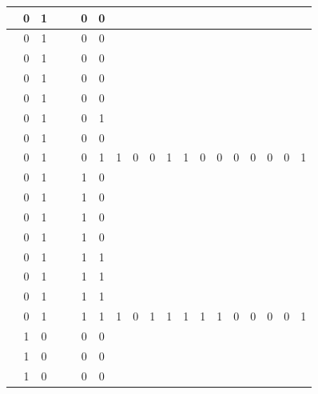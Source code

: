 \begin{table}[!tb]
\begin{tabular}{|c|c|c|c|c|c|c|c|c|c|c|c|c|c|c|c|c|c|c|}
        \rowcolor{red!40}  & 0 & 1 &  &  & 0 & 0 &  &  &  &  &  &  &  &  &  &  &  &  \\ \hline
        \rowcolor{red!40}  & 0 & 1 &  &  & 0 & 0 &  &  &  &  &  &  &  &  &  &  &  &  \\ \hline
        \rowcolor{red!40}  & 0 & 1 &  &  & 0 & 0 &  &  &  &  &  &  &  &  &  &  &  &  \\ \hline
        \rowcolor{red!40}  & 0 & 1 &  &  & 0 & 0 &  &  &  &  &  &  &  &  &  &  &  &  \\ \hline
        \rowcolor{red!40}  & 0 & 1 &  &  & 0 & 0 &  &  &  &  &  &  &  &  &  &  &  &  \\ \hline
        \rowcolor{red!40}  & 0 & 1 &  &  & 0 & 1 &  &  &  &  &  &  &  &  &  &  &  &  \\ \hline
        \rowcolor{red!40}  & 0 & 1 &  &  & 0 & 0 &  &  &  &  &  &  &  &  &  &  &  &  \\ \hline
        \rowcolor{red!40}  & 0 & 1 &  &  & 0 & 1 & 1 & 0 & 0 & 1 & 1 & 0 & 0 & 0 & 0 & 0 & 0 & 1 \\ \hline
        \rowcolor{green!40}  & 0 & 1 &  &  & 1 & 0 &  &  &  &  &  &  &  &  &  &  &  &  \\ \hline
        \rowcolor{green!40}  & 0 & 1 &  &  & 1 & 0 &  &  &  &  &  &  &  &  &  &  &  &  \\ \hline
        \rowcolor{green!40}  & 0 & 1 &  &  & 1 & 0 &  &  &  &  &  &  &  &  &  &  &  &  \\ \hline
        \rowcolor{green!40}  & 0 & 1 &  &  & 1 & 0 &  &  &  &  &  &  &  &  &  &  &  &  \\ \hline
        \rowcolor{green!40}  & 0 & 1 &  &  & 1 & 1 &  &  &  &  &  &  &  &  &  &  &  &  \\ \hline
        \rowcolor{green!40}  & 0 & 1 &  &  & 1 & 1 &  &  &  &  &  &  &  &  &  &  &  &  \\ \hline
        \rowcolor{green!40}  & 0 & 1 &  &  & 1 & 1 &  &  &  &  &  &  &  &  &  &  &  &  \\ \hline
        \rowcolor{green!40}  & 0 & 1 &  &  & 1 & 1 & 1 & 0 & 1 & 1 & 1 & 1 & 1 & 0 & 0 & 0 & 0 & 1 \\ \hline
        \rowcolor{yellow!40}  & 1 & 0 &  &  & 0 & 0 &  &  &  &  &  &  &  &  &  &  &  &  \\ \hline
        \rowcolor{yellow!40}  & 1 & 0 &  &  & 0 & 0 &  &  &  &  &  &  &  &  &  &  &  &  \\ \hline
        \rowcolor{yellow!40}  & 1 & 0 &  &  & 0 & 0 &  &  &  &  &  &  &  &  &  &  &  &  \\ \hline

\end{tabular}
\end{table}
